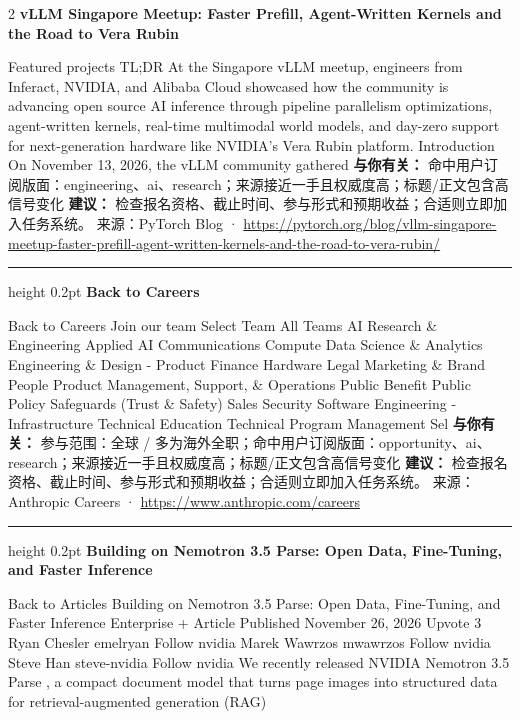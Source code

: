 \documentclass[10.5pt]{ctexart}
\begin{document}
\begin{multicols}{2}
{\large\bfseries vLLM Singapore Meetup: Faster Prefill, Agent-Written Kernels and the Road to Vera Rubin}\par
Featured projects TL;DR At the Singapore vLLM meetup, engineers from Inferact, NVIDIA, and Alibaba Cloud showcased how the community is advancing open source AI inference through pipeline parallelism optimizations, agent-written kernels, real-time multimodal world models, and day-zero support for next-generation hardware like NVIDIA’s Vera Rubin platform. Introduction On November 13, 2026, the vLLM community gathered
\textbf{与你有关：} 命中用户订阅版面：engineering、ai、research；来源接近一手且权威度高；标题/正文包含高信号变化
\textbf{建议：} 检查报名资格、截止时间、参与形式和预期收益；合适则立即加入任务系统。
{\footnotesize\color{ormuted} 来源：PyTorch Blog · \url{https://pytorch.org/blog/vllm-singapore-meetup-faster-prefill-agent-written-kernels-and-the-road-to-vera-rubin/}}
\vspace{2mm}
\hrule height 0.2pt
\vspace{2mm}
{\large\bfseries Back to Careers}\par
Back to Careers Join our team Select Team All Teams AI Research \& Engineering Applied AI Communications Compute Data Science \& Analytics Engineering \& Design - Product Finance Hardware Legal Marketing \& Brand People Product Management, Support, \& Operations Public Benefit Public Policy Safeguards (Trust \& Safety) Sales Security Software Engineering - Infrastructure Technical Education Technical Program Management Sel
\textbf{与你有关：} 参与范围：全球 / 多为海外全职；命中用户订阅版面：opportunity、ai、research；来源接近一手且权威度高；标题/正文包含高信号变化
\textbf{建议：} 检查报名资格、截止时间、参与形式和预期收益；合适则立即加入任务系统。
{\footnotesize\color{ormuted} 来源：Anthropic Careers · \url{https://www.anthropic.com/careers}}
\vspace{2mm}
\hrule height 0.2pt
\vspace{2mm}
{\large\bfseries Building on Nemotron 3.5 Parse: Open Data, Fine-Tuning, and Faster Inference}\par
Back to Articles Building on Nemotron 3.5 Parse: Open Data, Fine-Tuning, and Faster Inference Enterprise + Article Published November 26, 2026 Upvote 3 Ryan Chesler emelryan Follow nvidia Marek Wawrzos mwawrzos Follow nvidia Steve Han steve-nvidia Follow nvidia We recently released NVIDIA Nemotron 3.5 Parse , a compact document model that turns page images into structured data for retrieval-augmented generation (RAG)

\end{multicols}
\end{document}
